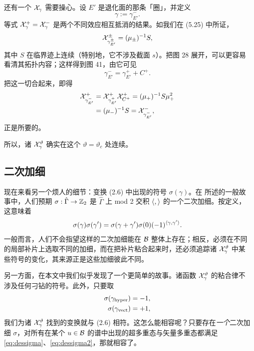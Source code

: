 还有一个 $\mathcal{X}_\gamma$ 需要操心。设 $E'$ 是退化面的那条「圈」，并定义
\begin{equation}
\gamma := \gamma^{-}_{E'}.
\end{equation}
等式 $\mathcal{X}^+_\gamma=\mathcal{X}^-_\gamma$ 是两个不同效应相互抵消的结果。如我们在 (5.25)%
中所证，
\begin{equation} \label{eq:deg-1}
\mathcal{X}^{\pm}_{\gamma^\pm_{E'}} = (\mu_\pm)^{-1} S,
\end{equation}
其中 $S$ 在临界迹上连续（特别地，它不涉及截面 $s$）。把图 28 展开，可以更容易看清其拓扑内容；这样得到图 41，由它可见
\begin{equation} \label{eq:degenerate-homology-jump}
\gamma^{-}_{E'} = \gamma^{+}_{E'} + C^+.
\end{equation}
把这一切合起来，即得
\begin{equation}
\begin{split}
\mathcal{X}^+_{\gamma^{-}_{E'}} &= \mathcal{X}^{+}_{\gamma^{+}_{E'}} \mathcal{X}^{+}_{C^+} = (\mu_+)^{-1} S \mu_+^{2} \\
&= (\mu_-)^{-1} S = \mathcal{X}^-_{\gamma^-_{E'}},
\end{split}
\end{equation}
正是所要的。

所以，诸 $\mathcal{X}^\vartheta_\gamma$ 确实在这个 $\vartheta=\vartheta_c$ 处连续。

\subsection{二次加细} \label{sec:quadratic-refinement}

现在来看另一个烦人的细节：变换 (2.6)%
中出现的符号 $\sigma(\gamma)$。在 \cite{Gaiotto:2008cd} 所述的一般故事中，人们预期 $\sigma:\hat\Gamma\to\mathbb{Z}_2$ 是 $\hat\Gamma$ 上 mod 2 交积 $\langle , \rangle$ 的一个二次加细。按定义，这意味着
\begin{equation}
\sigma(\gamma) \sigma(\gamma') = \sigma(\gamma + \gamma')\sigma(0) (-1)^{\langle \gamma, \gamma' \rangle}.
\end{equation}
一般而言，人们不会指望这样的二次加细能在 $\mathcal{B}$ 整体上存在；相反，必须在不同的局部补片上选取不同的加细，而在把补片粘合起来时，还必须追踪诸 $\mathcal{X}^\vartheta_\gamma$ 中某些符号的变化，其来源正是这些加细彼此不同。

另一方面，在本文中我们似乎发现了一个更简单的故事。诸函数 $\mathcal{X}^\vartheta_\gamma$ 的粘合律不涉及任何刁钻的符号。此外，只要取
\begin{align} \label{eq:dessigma}
\sigma(\gamma_{\rm hyper}) &= -1, \\
\sigma(\gamma_{\rm vect}) &= +1, \label{eq:dessigma2}
\end{align}
我们为诸 $\mathcal{X}^\vartheta_\gamma$ 找到的变换就与 (2.6)%
相符。这怎么能相容呢？只要存在\emph{一个}二次加细 $\sigma$，对所有在某个 $u\in\mathcal{B}$ 的谱中出现的超多重态与矢量多重态都满足 \eqref{eq:dessigma}、\eqref{eq:dessigma2}，那就相容了。

